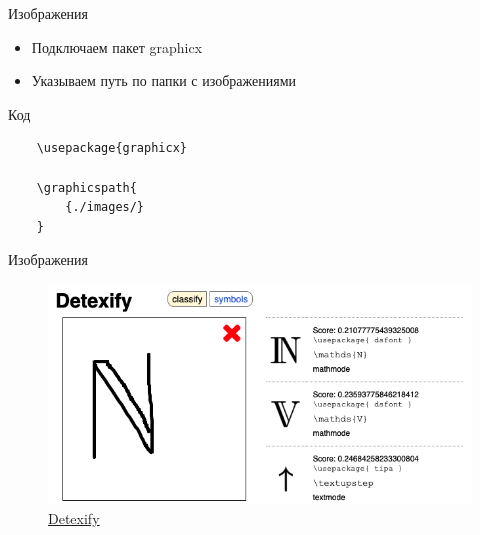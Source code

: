 
\begin{frame}[fragile]{Изображения}

\begin{itemize}
    \item Подключаем пакет graphicx
    \item Указываем путь по папки с изображениями
\end{itemize}

\begin{block}{Код}
    \begin{lstlisting}
    \usepackage{graphicx}
    
    \graphicspath{ 
        {./images/}
    }
    \end{lstlisting}
\end{block}

\end{frame}


\begin{frame}[fragile]{Изображения}

\begin{figure}
    \centering
    \includegraphics[scale=0.3]{images/detexify-small.png}
    \caption{\href{https://detexify.kirelabs.org/classify.html}
                  {\color{blue} Detexify}}
\end{figure}

\end{frame}


